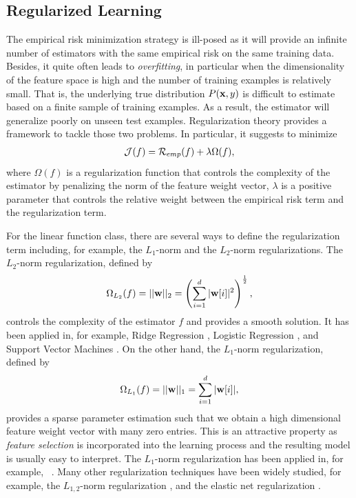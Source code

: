 \subsection{Regularized Learning}\label{sc_rl}

The empirical risk minimization strategy is ill-posed as it will provide an infinite number of estimators with the same empirical risk on the same training data.
Besides, it quite often leads to \textit{overfitting}, in particular when the dimensionality of the feature space is high and the number of training examples is relatively small.
That is, the underlying true distribution $P(\mathbf {x},y)$ is difficult to estimate based on a finite sample of training examples.
As a result, the estimator will generalize poorly on unseen test examples.
Regularization theory \citep{Evgeniou99a,Evgeniou02regularization} provides a framework to tackle those two problems.
In particular, it suggests to minimize 
 \begin{align}
	\mathcal{J}(f) = \mathcal{R}_{emp}(f) + \lambda\Omega(f), \label{rl}
\end{align}
where $\Omega(f)$ is a regularization function that controls the complexity of the estimator by penalizing the norm of the feature weight vector, $\lambda$ is a positive parameter that controls the relative weight between the empirical risk term and the regularization term.

For the linear function class, there are several ways to define the regularization term including, for example, the $L_1$-norm and the $L_2$-norm regularizations.
The $L_2$-norm regularization, defined by 
\begin{align}
	\Omega_{L_2}(f) = ||\mathbf {w}||_2=\left(\sum_{i=1}^d|\mathbf {w}[i]|^2\right)^{\frac{1}{2}}, \label{l2_norm}
\end{align} 
controls the complexity of the estimator $f$ and provides a smooth solution.
It has been applied in, for example, Ridge Regression \citep{Hoerl00ridge}, Logistic Regression \citep{Chen00}, and Support Vector Machines \citep{Cortes95support}.
On the other hand, the $L_1$-norm regularization, defined by
\begin{align*}
	\Omega_{L_1}(f) = ||\mathbf {w}||_1=\sum_{i=1}^d|\mathbf {w}[i]|,
\end{align*}
provides a sparse parameter estimation such that we obtain a high dimensional feature weight vector with many zero entries.
This is an attractive property as \textit{feature selection} is incorporated into the learning process and the resulting model is usually easy to interpret.
The $L_1$-norm regularization has been applied in, for example, \lasso\ \citep{Tibshirani94regression}.
Many other regularization techniques have been widely studied, for example, the $L_{1,2}$-norm regularization \citep{Argyriou07multitask}, and the elastic net regularization \citep{Zou05regularizationa}.


